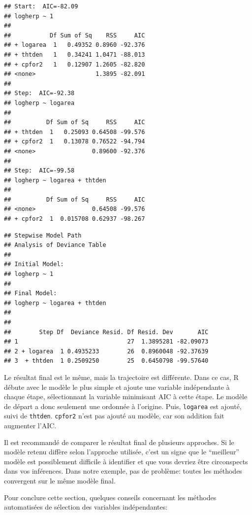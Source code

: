 \documentclass[12pt,]{book}
\newenvironment{Shaded}{\begin{snugshade}}{\end{snugshade}}
\newcommand{\CommentTok}[1]{\textcolor[rgb]{0.56,0.35,0.01}{\textit{#1}}}
\newcommand{\NormalTok}[1]{#1}
\newcommand{\OperatorTok}[1]{\textcolor[rgb]{0.81,0.36,0.00}{\textbf{#1}}}
\begin{document}
\begin{verbatim}
## Start:  AIC=-82.09
## logherp ~ 1
## 
##           Df Sum of Sq    RSS     AIC
## + logarea  1   0.49352 0.8960 -92.376
## + thtden   1   0.34241 1.0471 -88.013
## + cpfor2   1   0.12907 1.2605 -82.820
## <none>                 1.3895 -82.091
## 
## Step:  AIC=-92.38
## logherp ~ logarea
## 
##          Df Sum of Sq     RSS     AIC
## + thtden  1   0.25093 0.64508 -99.576
## + cpfor2  1   0.13078 0.76522 -94.794
## <none>                0.89600 -92.376
## 
## Step:  AIC=-99.58
## logherp ~ logarea + thtden
## 
##          Df Sum of Sq     RSS     AIC
## <none>                0.64508 -99.576
## + cpfor2  1  0.015708 0.62937 -98.267
\end{verbatim}

\begin{Shaded}
\end{Shaded}

\begin{verbatim}
## Stepwise Model Path 
## Analysis of Deviance Table
## 
## Initial Model:
## logherp ~ 1
## 
## Final Model:
## logherp ~ logarea + thtden
## 
## 
##        Step Df  Deviance Resid. Df Resid. Dev       AIC
## 1                               27  1.3895281 -82.09073
## 2 + logarea  1 0.4935233        26  0.8960048 -92.37639
## 3  + thtden  1 0.2509250        25  0.6450798 -99.57640
\end{verbatim}

Le résultat final est le même, mais la trajectoire est différente. Dans ce cas, R débute avec le modèle le plus simple et ajoute une variable indépendante à chaque étape, sélectionnant la variable minimisant AIC à cette étape. Le modèle de départ a donc seulement une ordonnée à l'origine. Puis, \texttt{logarea} est ajouté, suivi de \texttt{thtden}. \texttt{cpfor2} n'est pas ajouté au modèle, car son addition fait augmenter l'AIC.

Il est recommandé de comparer le résultat final de plusieurs approches. Si le modèle retenu diffère selon l'approche utilisée, c'est un signe que le ``meilleur'' modèle est possiblement difficile à identifier et que vous devriez être circonspects dans vos inférences. Dans notre exemple, pas de problème: toutes les méthodes convergent sur le même modèle final.

Pour conclure cette section, quelques conseils concernant les méthodes automatisées de sélection des variables indépendantes:
\end{document}
